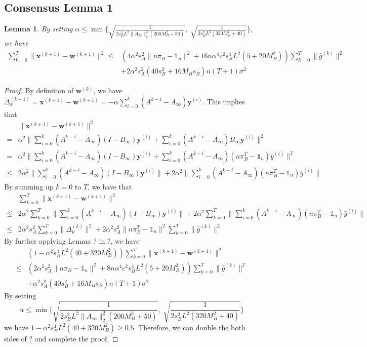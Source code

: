 \documentclass{article}
\newtheorem{lemma}[thm]{Lemma}
\newcommand{\vw}{{\mathbf{w}}}
\newcommand{\vx}{{\mathbf{x}}}
\newcommand{\vy}{{\mathbf{y}}}
\newcommand{\norm}[1]{\| #1 \|}
\newcommand{\one}{\mathds{1}_n}
\begin{document}
\subsection{Consensus Lemma 1}
\begin{lemma}
  By setting $\alpha \leq \min\{\sqrt{\frac{1}{2s_B^2L^2\norm{A_{\infty}}_2^2(200M_B^2+50)}},\; \sqrt{\frac{1}{2s_B^2L^2(320M_B^2+40)}}\} $, we have
  \begin{align*}
    \sum_{k=0}^T\norm{\vx^{(k+1)}-\vw^{(k+1)}}^2 
    \leq &\left(4\alpha^2s_A^2\norm{n\pi_B-\one}^2+16n\alpha^4c^2s_B^4L^2(5+20M_B^2)\right) \sum_{k=0}^T\norm{\bar{g}^{(k)}}^2\\ &+2\alpha^2s_A^2(40s_B^2+16M_Bs_B)n (T+1)\sigma^2
  \end{align*}
\end{lemma}
\begin{proof}
By definition of $\vw^{(k)}$, we have $\Delta_{x}^{(k+1)}=\vx^{(k+1)}-\vw^{(k+1)}=-\alpha\sum_{i=0}^k(A^{k-i}-A_{\infty})\vy^{(i)}$. This implies that
\begin{align*}
&\norm{\vx^{(k+1)}-\vw^{(k+1)}}^2\\ 
=&\alpha^2 \norm{\sum_{i=0}^k(A^{k-i}-A_{\infty})(I-B_{\infty})\vy^{(i)}+\sum_{i=0}^k(A^{k-i}-A_{\infty})B_{\infty}\vy^{(i)}}^2\\ 
=&\alpha^2 \norm{\sum_{i=0}^k(A^{k-i}-A_{\infty})(I-B_{\infty})\vy^{(i)}+\sum_{i=0}^k(A^{k-i}-A_{\infty})(n\pi_{B}^T-\one)\bar{y}^{(i)}}^2\\ 
\leq&2\alpha^2\norm{\sum_{i=0}^k(A^{k-i}-A_{\infty})(I-B_{\infty})\vy^{(i)}}+2\alpha^2\norm{\sum_{i=0}^k(A^{k-i}-A_{\infty})(n\pi_{B}^T-\one)\bar{y}^{(i)}}
\end{align*}
By summing up $k=0$ to $T$, we have that
\begin{align*}
&\sum_{k=0}^T\norm{\vx^{(k+1)}-\vw^{(k+1)}}^2\\ 
\leq& 2\alpha^2\sum_{k=0}^T\norm{\sum_{i=0}^k(A^{k-i}-A_{\infty})(I-B_{\infty})\vy^{(i)}}+2\alpha^2\sum_{k=0}^T\norm{\sum_{i=0}^k(A^{k-i}-A_{\infty})(n\pi_{B}^T-\one)\bar{y}^{(i)}}\\ 
\leq& 2\alpha^2s_{A}^2\sum_{k=0}^T \norm{\Delta_{y}^{(k)}}^2+2\alpha^2s_{A}^2\norm{n\pi_{B}^T-\one}^2\sum_{k=0}^T\norm{\bar{g}^{(k)}}^2
\end{align*}
By further applying Lemma ? in ?, we have
\begin{align*}
  &\left(1-\alpha^2s_B^4L^2(40+320M_B^2)\right)\sum_{k=0}^T\norm{\vx^{(k+1)}-\vw^{(k+1)}}^2\\ 
  \leq &\left(2\alpha^2s_A^2\norm{n\pi_B-\one}^2+8n\alpha^4c^2s_B^4L^2(5+20M_B^2)\right) \sum_{k=0}^T\norm{\bar{g}^{(k)}}^2\\ &+\alpha^2s_A^2(40s_B^2+16M_Bs_B)n (T+1)\sigma^2
\end{align*}
By setting 
$$\alpha \leq \min\{\sqrt{\frac{1}{2s_B^2L^2\norm{A_{\infty}}_2^2(200M_B^2+50)}},\; \sqrt{\frac{1}{2s_B^2L^2(320M_B^2+40)}}\} $$
we have $1-\alpha^2s_B^4L^2(40+320M_B^2)\geq 0.5$. Therefore, we can double the both sides of ? and complete the proof.
\end{proof}
\end{document}
